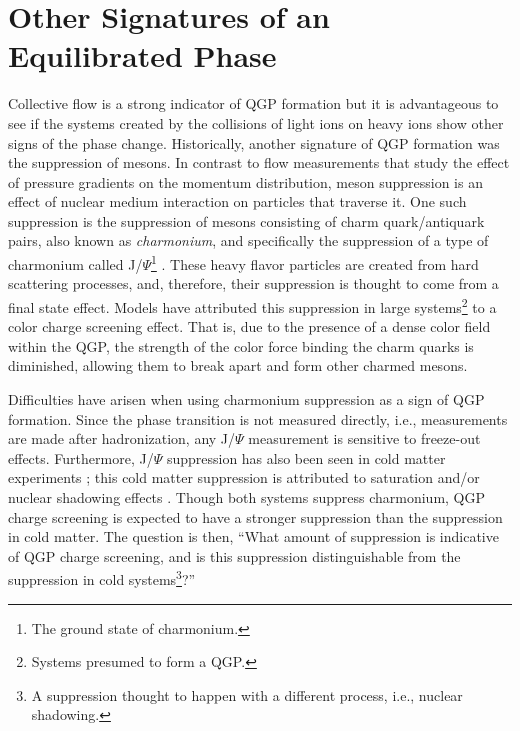 \section{Other Signatures of an Equilibrated Phase}

Collective flow is a strong indicator of QGP formation but it is advantageous to see if the systems created by the collisions of light ions on heavy ions show other signs of the phase change. Historically, another signature of QGP formation was the suppression of mesons. In contrast to flow measurements that study the effect of pressure gradients on the momentum distribution, meson suppression is an effect of nuclear medium interaction on particles that traverse it. One such suppression is the suppression of mesons consisting of charm quark/antiquark pairs, also known as \textit{charmonium}, and specifically the suppression of a type of charmonium called J/$\Psi$\footnote{The ground state of charmonium.} \citep{Adare:2006ns}. These heavy flavor particles are created from hard scattering processes, and, therefore, their suppression is thought to come from a final state effect. Models have attributed this suppression in large systems\footnote{Systems presumed to form a QGP.} to a color charge screening effect. That is, due to the presence of a dense color field within the QGP, the strength of the color force binding the charm quarks is diminished, allowing them to break apart and form other charmed mesons. 

Difficulties have arisen when using charmonium suppression as a sign of QGP formation. Since the phase transition is not measured directly, i.e., measurements are made after hadronization, any J/$\Psi$ measurement is sensitive to freeze-out effects. Furthermore, J/$\Psi$ suppression has also been seen in cold matter experiments \citep{PhysRevLett.84.3256}; this cold matter suppression is attributed to saturation and/or nuclear shadowing effects \citep{Armesto:2006ph}. Though both systems suppress charmonium, QGP charge screening is expected to have a stronger suppression than the suppression in cold matter. The question is then, ``What amount of suppression is indicative of QGP charge screening, and is this suppression distinguishable from the suppression in cold systems\footnote{A suppression thought to happen with a different process, i.e., nuclear shadowing.}?''

